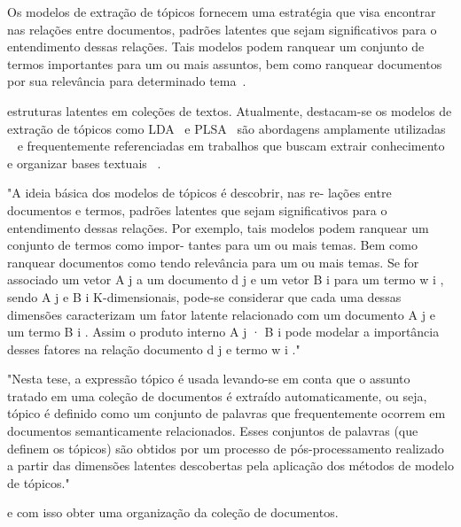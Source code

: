 
Os modelos de extração de tópicos fornecem uma estratégia que visa encontrar nas relações entre documentos, padrões latentes que sejam significativos para o entendimento dessas relações. Tais modelos podem ranquear um conjunto de termos importantes para um ou mais assuntos, bem como ranquear documentos por sua relevância para determinado tema~\cite{Faleiros}.


estruturas latentes em coleções de textos. Atualmente, destacam-se os modelos de extração de tópicos como LDA~\cite{Blei2003} e PLSA~\cite{Hofmann1999} são abordagens amplamente utilizadas ~\cite{DZhu20122} e frequentemente referenciadas em trabalhos que buscam extrair conhecimento e organizar bases textuais ~\cite{Steyvers2007, OCallaghan2015}. 

"A ideia básica dos modelos de tópicos é descobrir, nas re- lações entre documentos e termos, padrões latentes que sejam significativos para o entendimento dessas relações. Por exemplo, tais modelos podem ranquear um conjunto de termos como impor- tantes para um ou mais temas. Bem como ranquear documentos como tendo relevância para um ou mais temas. Se for associado um vetor A j a um documento d j e um vetor B i para um termo w i , sendo A j e B i K-dimensionais, pode-se considerar que cada uma dessas dimensões caracterizam um fator latente relacionado com um documento A j e um termo B i . Assim o produto interno A j · B i pode modelar a importância desses fatores na relação documento d j e termo w i ."




"Nesta tese, a expressão tópico é usada levando-se em conta que o assunto tratado em uma coleção de documentos é extraído automaticamente, ou seja, tópico é definido como um conjunto de palavras que frequentemente ocorrem em documentos semanticamente relacionados. Esses conjuntos de palavras (que definem os tópicos) são obtidos por um processo de pós-processamento realizado a partir das dimensões latentes descobertas pela aplicação dos métodos de modelo de tópicos."  



e com isso obter uma organização da coleção de documentos.











